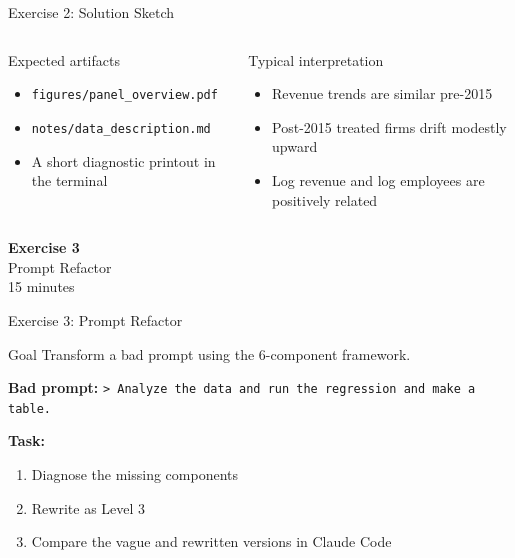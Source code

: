 \documentclass[aspectratio=169,10pt]{beamer}
\begin{document}
\begin{frame}{Exercise 2: Solution Sketch}
\small
\begin{columns}[T]
\begin{exampleblock}{Expected artifacts}
\begin{itemize}\itemsep1pt
    \item \texttt{figures/panel\_overview.pdf}
    \item \texttt{notes/data\_description.md}
    \item A short diagnostic printout in the terminal
\end{itemize}
\end{exampleblock}

\begin{alertblock}{Typical interpretation}
\begin{itemize}\itemsep1pt
    \item Revenue trends are similar pre-2015
    \item Post-2015 treated firms drift modestly upward
    \item Log revenue and log employees are positively related
\end{itemize}
\end{alertblock}
\end{columns}
\end{frame}

\begin{frame}{}
\vfill\begin{center}{\Huge \textcolor{uzhblue}{\textbf{Exercise 3}}}\\[12pt]
{\LARGE Prompt Refactor}\\[6pt]{\small 15 minutes}\end{center}\vfill
\end{frame}

\begin{frame}[fragile]{Exercise 3: Prompt Refactor}
\begin{exampleblock}{Goal}
Transform a bad prompt using the 6-component framework.
\end{exampleblock}
\small
\textbf{Bad prompt:} \texttt{> Analyze the data and run the regression and make a table.}

\vspace{0.3em}
\textbf{Task:}
\begin{enumerate}\itemsep1pt
    \item Diagnose the missing components
    \item Rewrite as Level 3
    \item Compare the vague and rewritten versions in Claude Code
\end{enumerate}
\end{frame}
\end{document}
